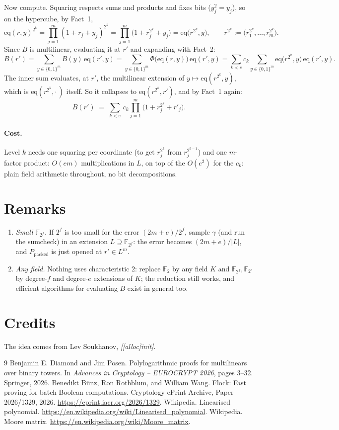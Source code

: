 \documentclass[11pt]{article}
\newcommand{\F}{\mathbb{F}}
\newcommand{\eq}{\mathrm{eq}}
\newcommand{\pkd}{\mathrm{packed}}
\begin{document}
Now compute. Squaring respects sums and products and fixes bits ($y_j^2=y_j$), so on the hypercube, by Fact~1,
\[
\eq(r,y)^{2^k}=\prod_{j=1}^m(1+r_j+y_j)^{2^k}=\prod_{j=1}^m\bigl(1+r_j^{2^k}+y_j\bigr)=\eq\bigl(r^{2^k},y\bigr),
\qquad r^{2^k}:=\bigl(r_1^{2^k},\dots,r_m^{2^k}\bigr).
\]
Since $B$ is multilinear, evaluating it at $r'$ and expanding with Fact~2:
\[
B(r')=\sum_{y\in\{0,1\}^m}B(y)\,\eq(r',y)
=\sum_{y\in\{0,1\}^m}\Phi\bigl(\eq(r,y)\bigr)\,\eq(r',y)
=\sum_{k<e}c_k\sum_{y\in\{0,1\}^m}\eq\bigl(r^{2^k},y\bigr)\,\eq(r',y).
\]
The inner sum evaluates, at $r'$, the multilinear extension of $y\mapsto\eq(r^{2^k},y)$, which is $\eq(r^{2^k},\cdot\,)$ itself. So it collapses to $\eq(r^{2^k},r')$, and by Fact~1 again:
\[
\boxed{\ \
B(r') \;=\; \sum_{k<e}\, c_k \prod_{j=1}^m
\bigl( 1 + r_j^{2^k} + r'_j \bigr).
\ \ }
\]

\paragraph{Cost.} Level $k$ needs one squaring per coordinate (to get $r_j^{2^k}$ from $r_j^{2^{k-1}}$) and one $m$-factor product: $O(em)$ multiplications in $L$, on top of the $O(e^2)$ for the $c_k$: plain field arithmetic throughout, no bit decompositions.

\section*{Remarks}

\begin{enumerate}
\item \emph{Small $\F_{2^f}$.} If $2^f$ is too small for the error $(2m+e)/2^f$, sample $\gamma$ (and run the sumcheck) in an extension $L\supseteq\F_{2^f}$: the error becomes $(2m+e)/|L|$, and $P_\pkd$ is just opened at $r'\in L^m$.
\item \emph{Any field.} Nothing uses characteristic $2$: replace $\F_2$ by any field $K$ and $\F_{2^f},\F_{2^e}$ by degree-$f$ and degree-$e$ extensions of $K$; the reduction still works, and efficient algorithms for evaluating $B$ exist in general too.
\end{enumerate}

\section*{Credits}

The idea comes from Lev Soukhanov, \textit{[[alloc]init]}.

\begin{thebibliography}{9}
 Benjamin E. Diamond and Jim Posen. Polylogarithmic proofs for multilinears over binary towers. In \emph{Advances in Cryptology -- EUROCRYPT 2026}, pages 3--32. Springer, 2026.
\bibitem{Flock} Benedikt B\"unz, Ron Rothblum, and William Wang. Flock: Fast proving for batch Boolean computations. Cryptology ePrint Archive, Paper 2026/1329, 2026. \url{https://eprint.iacr.org/2026/1329}.
\bibitem{WikiLinPoly} Wikipedia. Linearised polynomial. \url{https://en.wikipedia.org/wiki/Linearised_polynomial}.
\bibitem{WikiMoore} Wikipedia. Moore matrix. \url{https://en.wikipedia.org/wiki/Moore_matrix}.
\end{thebibliography}
\end{document}
